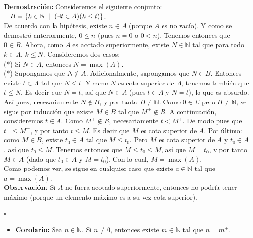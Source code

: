 \documentclass[10 pt]{article}
\begin{document}
\Large{\textbf{Demostración:} Consideremos el siguiente conjunto: \\

-- $B=\{k \in \mathbb N \hspace{0.2 cm}|\hspace{0.2 cm}(\exists t\in A)(k \leq t)\}$. \\

De acuerdo con la hipótesis, existe $n \in A$ (porque $A$ es no vacío). Y como se demostró anteriormente, $0 \leq n$ (pues $n=0$ o $0<n$). Tenemos entonces que $0 \in B$. Ahora, como $A$ es acotado superiormente, existe $N \in \mathbb N$ tal que para todo $k \in A$, $k \leq N$. Consideremos dos casos: \\

($\ast$) Si $N \in A$, entonces $N=\max(A)$. \\

($\ast$) Supongamos que $N \notin A$. Adicionalmente, supongamos que $N \in B$. Entonces existe $t \in A$ tal que $N \leq t$. Y como $N$ es cota superior de $A$, tenemos también que $t \leq N$. Es decir que $N=t$, así que $N \in A$ (pues $t \in A$ y $N=t$), lo que es absurdo. Así pues, necesariamente $N \notin B$, y por tanto $B \neq \mathbb N$. Como $0 \in B$ pero $B \neq \mathbb N$, se sigue por inducción que existe $M \in B$ tal que $M^+ \notin B$. A continuación, consideremos $t \in A$. Como $M^+ \notin B$, necesariamente $t<M^+$. De modo pues que $t^+ \leq M^+$, y por tanto $t \leq M$. Es decir que $M$ es cota superior de $A$. Por último: como $M \in B$, existe $t_0 \in A$ tal que $M \leq t_0$. Pero $M$ es cota superior de $A$ y $t_0 \in A$, así que $t_0 \leq M$. Tenemos entonces que $M \leq t_0 \leq M$, así que $M=t_0$, y por tanto $M \in A$ (dado que $t_0 \in A$ y $M=t_0$). Con lo cual, $M=\max(A)$.  \\

Como podemos ver, se sigue en cualquier caso que existe $a \in \mathbb N$ tal que $a=\max(A)$.} \\

\Large{\textbf{Observación:} Si $A$ no fuera acotado superiormente, entonces no podría tener máximo (porque un elemento máximo es a su vez cota superior).} \\

\begin{flushright}
    $\square$
\end{flushright}

\begin{itemize}
    \item \Large{\textbf{Corolario:} Sea $n \in \mathbb N$. Si $n \neq 0$, entonces existe $m \in \mathbb N$ tal que $n=m^+$.} \\
\end{itemize}
\end{document}
